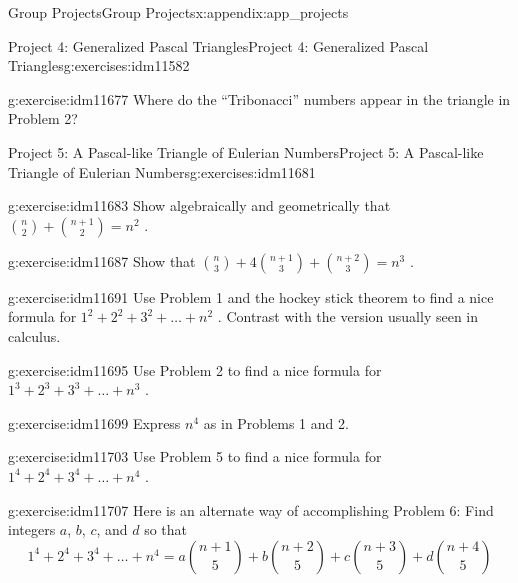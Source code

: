 \documentclass[oneside,10pt,]{book}
\numberwithin{equation}{chapter}
\begin{document}
\begin{appendixptx}{Group Projects}{}{Group Projects}{}{}{x:appendix:app_projects}
\begin{exercises-section-numberless}{Project 4: Generalized Pascal Triangles}{}{Project 4: Generalized Pascal Triangles}{}{}{g:exercises:idm11582}
\begin{divisionexercise}{8}{}{}{g:exercise:idm11677}%
Where do the ``Tribonacci'' numbers appear in the triangle in Problem 2?%
\end{divisionexercise}%
\end{exercises-section-numberless}
%
%
\typeout{************************************************}
\typeout{************************************************}
%
\begin{exercises-section-numberless}{Project 5: A Pascal-like Triangle of Eulerian Numbers}{}{Project 5: A Pascal-like Triangle of Eulerian Numbers}{}{}{g:exercises:idm11681}
\begin{divisionexercise}{1}{}{}{g:exercise:idm11683}%
Show algebraically and geometrically that \(\binom{n}{2}
+
\binom{n + 1}{2}
= n^{2}\) .%
\end{divisionexercise}%
\begin{divisionexercise}{2}{}{}{g:exercise:idm11687}%
Show that \(\binom{n}{3}
+ 4
\binom{n + 1}{3}
+
\binom{n + 2}{3}
= n^{3}\) .%
\end{divisionexercise}%
\begin{divisionexercise}{3}{}{}{g:exercise:idm11691}%
Use Problem 1 and the hockey stick theorem to find a nice formula for \(1^{2} + 2^{2} + 3^{2} + \ldots + n^{2}\) . Contrast with the version usually seen in calculus.%
\end{divisionexercise}%
\begin{divisionexercise}{4}{}{}{g:exercise:idm11695}%
Use Problem 2 to find a nice formula for \(1^{3} + 2^{3} + 3^{3} + \ldots + n^{3}\) .%
\end{divisionexercise}%
\begin{divisionexercise}{5}{}{}{g:exercise:idm11699}%
Express \(n^{4}\) as in Problems 1 and 2.%
\end{divisionexercise}%
\begin{divisionexercise}{6}{}{}{g:exercise:idm11703}%
Use Problem 5 to find a nice formula for \(1^{4} + 2^{4} + 3^{4} + \ldots + n^{4}\) .%
\end{divisionexercise}%
\begin{divisionexercise}{7}{}{}{g:exercise:idm11707}%
Here is an alternate way of accomplishing Problem 6:  Find integers \(a\), \(b\), \(c\), and \(d\) so that%
\begin{equation*}
1^{4} + 2^{4} + 3^{4} + \ldots + n^{4} = a\binom{n + 1}{5}  + b\binom{n + 2}{5}  + c\binom{n + 3}{5}  + d\binom{n + 4}{5}

\end{equation*}
\end{divisionexercise}
\end{exercises-section-numberless}
\end{appendixptx}
\end{document}
